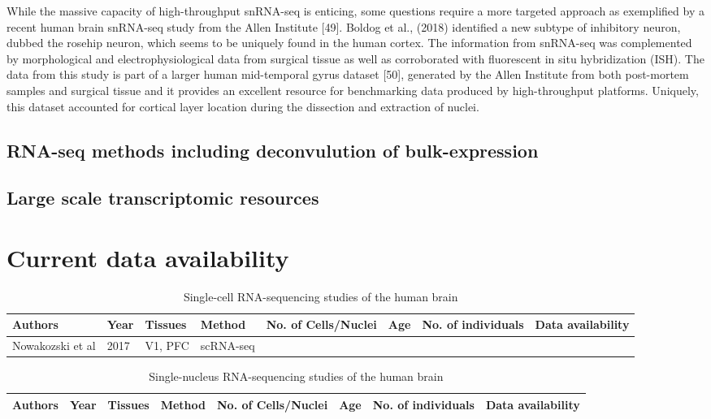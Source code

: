 \documentclass[12pt]{article}
\begin{document}
While the massive capacity of high-throughput snRNA-seq is enticing, some questions require a more targeted approach as exemplified by a recent human brain snRNA-seq study from the Allen Institute [49]. Boldog et al., (2018) identified a new subtype of inhibitory neuron, dubbed the rosehip neuron, which seems to be uniquely found in the human cortex. The information from snRNA-seq was complemented by morphological and electrophysiological data from surgical tissue as well as corroborated with fluorescent in situ hybridization (ISH). The data from this study is part of a larger human mid-temporal gyrus dataset [50], generated by the Allen Institute from both post-mortem samples and surgical tissue and it provides an excellent resource for benchmarking data produced by high-throughput platforms. Uniquely, this dataset accounted for cortical layer location during the dissection and extraction of nuclei.
 

\subsection{RNA-seq methods including deconvulution of bulk-expression}

\subsection{Large scale transcriptomic resources}



\section{Current data availability}

\begin{landscape}
	\begin{table}[!htp]
		\centering
		\footnotesize
		\caption{Single-cell RNA-sequencing studies of the human brain}
		\begin{tabular}{|l|l|l|l|l|l|l|l|}
			\hline
			\textbf{Authors} &\textbf{Year}  & \textbf{Tissues} & \textbf{Method} & \textbf{No. of Cells/Nuclei}  & \textbf{Age} &  \textbf{No. of individuals} & \textbf{Data availability}  \\ \hline
			Nowakozski et al & 2017 &V1, PFC & scRNA-seq     & &&& \\ \hline
		\end{tabular}
	\end{table}
\end{landscape}



\begin{landscape}
	\begin{table}[!htp]
		\centering
		\footnotesize
		\caption{Single-nucleus RNA-sequencing studies of the human brain}
		\begin{tabular}{|l|l|l|l|l|l|l|l|}
			\hline
			\textbf{Authors} &\textbf{Year}  & \textbf{Tissues} & \textbf{Method} & \textbf{No. of Cells/Nuclei}  & \textbf{Age} &  \textbf{No. of individuals} & \textbf{Data availability}  \\ \hline
		\end{tabular}
	\end{table}
\end{landscape}
\end{document}
